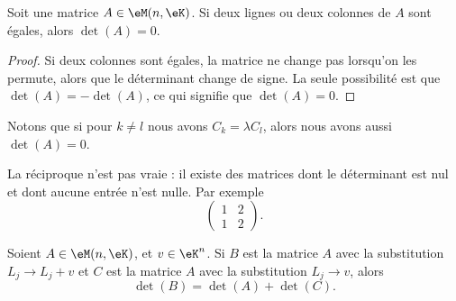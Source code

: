 \begin{corollary}        \label{CORooAZFCooSYINvBl}
	Soit une matrice \( A\in \eM(n,\eK)\). Si deux lignes ou deux colonnes de \( A\) sont égales, alors \( \det(A)=0\).
\end{corollary}

\begin{proof}
	Si deux colonnes sont égales, la matrice ne change pas lorsqu'on les permute, alors que le déterminant change de signe. La seule possibilité est que \( \det(A)=-\det(A)\), ce qui signifie que \( \det(A)=0\).
\end{proof}
Notons que si pour \( k\neq l\) nous avons \( C_k=\lambda C_l\), alors nous avons aussi \( \det(A)=0\).

La réciproque n'est pas vraie : il existe des matrices dont le déterminant est nul et dont aucune entrée n'est nulle. Par exemple
\begin{equation}
	\begin{pmatrix}
		1 & 2 \\
		1 & 2
	\end{pmatrix}.
\end{equation}


\begin{proposition}      \label{PROPooNGZJooHjtMyn}
	Soient \( A\in \eM(n,\eK)\), et \( v\in \eK^n\). Si \( B\) est la matrice \( A\) avec la substitution \( L_j\to L_j+v\) et \( C\) est la matrice \( A\) avec la substitution \( L_j\to v\), alors
	\begin{equation}
		\det(B)=\det(A)+\det(C).
	\end{equation}
\end{proposition}

